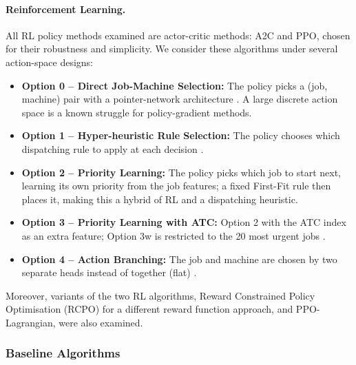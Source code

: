 \documentclass[12pt]{article}
\begin{document}
\paragraph{Reinforcement Learning.} All RL policy methods examined are actor-critic methods: A2C and PPO, chosen for their robustness and simplicity. We consider these algorithms under several action-space designs:
\begin{itemize}
    \item \textbf{Option 0 -- Direct Job-Machine Selection:} The policy picks a (job, machine) pair with a pointer-network architecture \cite{vinyals2015pointernet, kool2019attention}. A large discrete action space is a known struggle for policy-gradient methods.
    \item \textbf{Option 1 -- Hyper-heuristic Rule Selection:} The policy chooses which dispatching rule to apply at each decision \cite{burke2013hyperheuristicsurvey, lassoued2026hyperheuristic}.
    \item \textbf{Option 2 -- Priority Learning:} The policy picks which job to start next, learning its own priority from the job features; a fixed First-Fit rule then places it, making this a hybrid of RL and a dispatching heuristic.
    \item \textbf{Option 3 -- Priority Learning with ATC:} Option 2 with the ATC index \cite{vepsalainen1987atc} as an extra feature; Option 3w is restricted to the 20 most urgent jobs \cite{mao2016deeprm}.
    \item \textbf{Option 4 -- Action Branching:} The job and machine are chosen by two separate heads instead of together (flat) \cite{tavakoli2018actionbranching}.
\end{itemize}
Moreover, variants of the two RL algorithms, Reward Constrained Policy Optimisation (RCPO) for a different reward function approach, and PPO-Lagrangian, were also examined.

\subsubsection{Baseline Algorithms}
\end{document}
